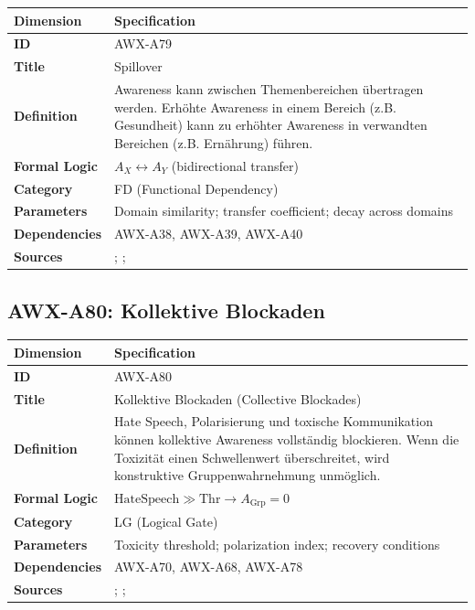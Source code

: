\begin{table}[htbp]
\small
\begin{tabular}{p{3cm}p{11cm}}
\toprule
\textbf{Dimension} & \textbf{Specification} \\
\midrule
\textbf{ID} & AWX-A79 \\
\textbf{Title} & Spillover \\
\textbf{Definition} & Awareness kann zwischen Themenbereichen übertragen werden. Erhöhte Awareness in einem Bereich (z.B. Gesundheit) kann zu erhöhter Awareness in verwandten Bereichen (z.B. Ernährung) führen. \\
\textbf{Formal Logic} & $A_X \leftrightarrow A_Y$ (bidirectional transfer) \\
\textbf{Category} & FD (Functional Dependency) \\
\textbf{Parameters} & Domain similarity; transfer coefficient; decay across domains \\
\textbf{Dependencies} & AWX-A38, AWX-A39, AWX-A40 \\
\textbf{Sources} & \citet{PAP-thaler1999mental}; \citet{dolan2012influencing}; \citet{milkman2014holding} \\
\bottomrule
\end{tabular}
\end{table}


\subsection{AWX-A80: Kollektive Blockaden}

\begin{table}[htbp]
\small
\begin{tabular}{p{3cm}p{11cm}}
\toprule
\textbf{Dimension} & \textbf{Specification} \\
\midrule
\textbf{ID} & AWX-A80 \\
\textbf{Title} & Kollektive Blockaden (Collective Blockades) \\
\textbf{Definition} & Hate Speech, Polarisierung und toxische Kommunikation können kollektive Awareness vollständig blockieren. Wenn die Toxizität einen Schwellenwert überschreitet, wird konstruktive Gruppenwahrnehmung unmöglich. \\
\textbf{Formal Logic} & $\text{HateSpeech} \gg \text{Thr} \rightarrow A_{\text{Grp}} = 0$ \\
\textbf{Category} & LG (Logical Gate) \\
\textbf{Parameters} & Toxicity threshold; polarization index; recovery conditions \\
\textbf{Dependencies} & AWX-A70, AWX-A68, AWX-A78 \\
\textbf{Sources} & \citet{sunstein2017republic}; \citet{bail2018exposure}; \citet{brady2017emotion} \\
\bottomrule
\end{tabular}
\end{table}


